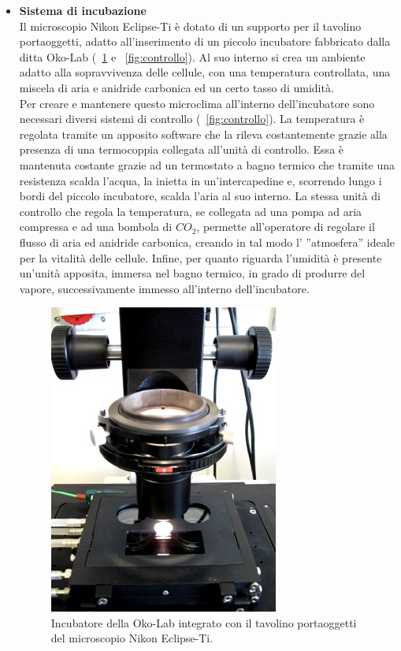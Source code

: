 \begin{itemize}
\item \textbf{Sistema di incubazione}\\
Il microscopio Nikon Eclipse-Ti è dotato di un supporto per il tavolino portaoggetti, adatto all'inserimento di un piccolo incubatore fabbricato dalla ditta Oko-Lab (\figurename~\ref{fig:okolab} e \figurename~\ref{fig:controllo}). Al suo interno si crea un ambiente adatto alla sopravvivenza delle cellule, con una temperatura controllata, una miscela di aria e anidride carbonica ed un certo tasso di umidità. \\
Per creare e mantenere questo microclima all'interno dell'incubatore sono necessari diversi sistemi di controllo (\figurename~\ref{fig:controllo}). La temperatura è regolata tramite un apposito software che la rileva costantemente grazie alla presenza di una termocoppia collegata all'unità di controllo. Essa è mantenuta costante grazie ad un termostato a bagno termico che tramite una resistenza scalda l'acqua, la inietta in un'intercapedine e, scorrendo lungo i bordi del piccolo incubatore, scalda l'aria al suo interno.
La stessa unità di controllo che regola la temperatura, se collegata ad una pompa ad aria compressa e ad una bombola di $CO_2$, permette all'operatore di regolare il flusso di aria ed anidride carbonica, creando in tal modo l' ''atmosfera'' ideale per la vitalità delle cellule. Infine, per quanto riguarda l'umidità è presente un'unità apposita, immersa nel bagno termico, in grado di produrre del vapore, successivamente immesso all'interno dell'incubatore.

\begin{figure}[!ht]
 \centering
 \includegraphics[scale=.30]{img/CAP2okolab.png}
 \caption{\small{Incubatore della Oko-Lab integrato con il tavolino portaoggetti del microscopio Nikon Eclipse-Ti.}}
 \label{fig:okolab}
\end{figure}


\end{itemize}
